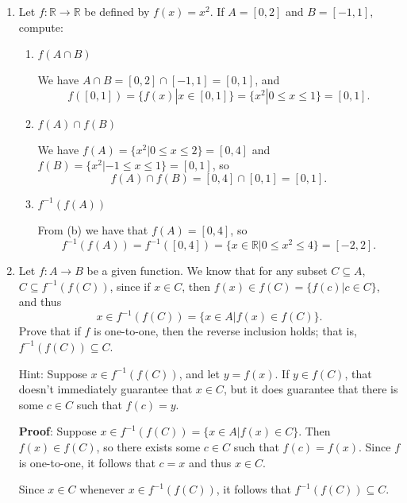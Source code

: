 \documentclass[12pt]{article}
\newcommand{\points}[1]{\marginpar{\hspace{24pt}[#1]}}
\newcommand{\R}{\mathbb{R}}
\begin{document}
\thispagestyle{fancy}

 \begin{enumerate}
 \item Let $f:\R\to\R$ be defined by $f(x)=x^2$. If $A=[0,2]$ and $B=[-1,1]$, compute:
\begin{enumerate}
 \item $f(A\cap B)$\points{2}

\bigskip

We have $A\cap B = [0,2]\cap [-1,1] = [0,1]$, and
\[
 f([0,1]) = \{f(x)|x\in [0,1]\} = \{x^2 | 0\leq x\leq 1\} = [0,1].
\]

\bigskip

 \item $f(A)\cap f(B)$\points{2}

\bigskip

We have $f(A) = \{x^2|0\leq x\leq 2\} = [0,4]$ and $f(B) = \{x^2 | -1\leq x\leq 1\} = [0,1]$, so
\[
 f(A)\cap f(B) = [0,4]\cap [0,1] = [0,1].
\]

\bigskip

 \item $f^{-1}(f(A))$\points{2}

\bigskip

From (b) we have that $f(A) = [0,4]$, so
\[
 f^{-1}(f(A)) = f^{-1}([0,4]) = \{x\in \R | 0\leq x^2\leq 4\} = [-2,2].
\]

\end{enumerate}
\newpage

\item Let $f:A\to B$ be a given function. We know that for any subset $C\subseteq A$, $C\subseteq f^{-1}(f(C))$, since if $x\in C$, then $f(x)\in f(C)=\{f(c)|c\in C\}$, and thus 
\[
x\in f^{-1}(f(C))=\{x\in A | f(x)\in f(C)\}. 
\]
Prove that if $f$ is one-to-one, then the reverse inclusion holds; that is, $f^{-1}(f(C))\subseteq C$.\points{4}

Hint: Suppose $x\in f^{-1}(f(C))$, and let $y= f(x)$. If $y\in f(C)$, that doesn't immediately guarantee that $x\in C$, but it does guarantee that there is some $c\in C$ such that $f(c)=y$.


\bigskip

{\bf Proof}: Suppose $x\in f^{-1}(f(C)) = \{x\in A | f(x)\in C\}$. Then $f(x)\in f(C)$, so there exists some $c\in C$ such that $f(c)=f(x)$. Since $f$ is one-to-one, it follows that $c=x$ and thus $x\in C$.

Since $x\in C$ whenever $x\in f^{-1}(f(C))$, it follows that $f^{-1}(f(C))\subseteq C$.
 \end{enumerate}
\end{document}

